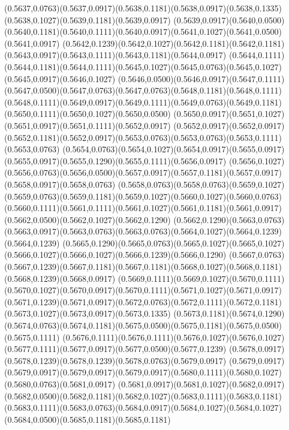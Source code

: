 (0.5637,0.0763)(0.5637,0.0917)(0.5638,0.1181)(0.5638,0.0917)(0.5638,0.1335)(0.5638,0.1027)(0.5639,0.1181)(0.5639,0.0917)
(0.5639,0.0917)(0.5640,0.0500)(0.5640,0.1181)(0.5640,0.1111)(0.5640,0.0917)(0.5641,0.1027)(0.5641,0.0500)(0.5641,0.0917)
(0.5642,0.1239)(0.5642,0.1027)(0.5642,0.1181)(0.5642,0.1181)(0.5643,0.0917)(0.5643,0.1111)(0.5643,0.1181)(0.5644,0.0917)
(0.5644,0.1111)(0.5644,0.1181)(0.5644,0.1111)(0.5645,0.1027)(0.5645,0.0763)(0.5645,0.1027)(0.5645,0.0917)(0.5646,0.1027)
(0.5646,0.0500)(0.5646,0.0917)(0.5647,0.1111)(0.5647,0.0500)(0.5647,0.0763)(0.5647,0.0763)(0.5648,0.1181)(0.5648,0.1111)
(0.5648,0.1111)(0.5649,0.0917)(0.5649,0.1111)(0.5649,0.0763)(0.5649,0.1181)(0.5650,0.1111)(0.5650,0.1027)(0.5650,0.0500)
(0.5650,0.0917)(0.5651,0.1027)(0.5651,0.0917)(0.5651,0.1111)(0.5652,0.0917)
\PST@Solid(0.5652,0.0917)(0.5652,0.0917)(0.5652,0.1181)(0.5652,0.0917)(0.5653,0.0763)(0.5653,0.0763)(0.5653,0.1111)(0.5653,0.0763)
(0.5654,0.0763)(0.5654,0.1027)(0.5654,0.0917)(0.5655,0.0917)(0.5655,0.0917)(0.5655,0.1290)(0.5655,0.1111)(0.5656,0.0917)
(0.5656,0.1027)(0.5656,0.0763)(0.5656,0.0500)(0.5657,0.0917)(0.5657,0.1181)(0.5657,0.0917)(0.5658,0.0917)(0.5658,0.0763)
(0.5658,0.0763)(0.5658,0.0763)(0.5659,0.1027)(0.5659,0.0763)(0.5659,0.1181)(0.5659,0.1027)(0.5660,0.1027)(0.5660,0.0763)
(0.5660,0.1111)(0.5661,0.1111)(0.5661,0.1027)(0.5661,0.1181)(0.5661,0.0917)(0.5662,0.0500)(0.5662,0.1027)(0.5662,0.1290)
(0.5662,0.1290)(0.5663,0.0763)(0.5663,0.0917)(0.5663,0.0763)(0.5663,0.0763)(0.5664,0.1027)(0.5664,0.1239)(0.5664,0.1239)
(0.5665,0.1290)(0.5665,0.0763)(0.5665,0.1027)(0.5665,0.1027)(0.5666,0.1027)(0.5666,0.1027)(0.5666,0.1239)(0.5666,0.1290)
(0.5667,0.0763)(0.5667,0.1239)(0.5667,0.1181)(0.5667,0.1181)(0.5668,0.1027)(0.5668,0.1181)(0.5668,0.1239)(0.5668,0.0917)
(0.5669,0.1111)(0.5669,0.1027)(0.5670,0.1111)(0.5670,0.1027)(0.5670,0.0917)(0.5670,0.1111)(0.5671,0.1027)(0.5671,0.0917)
(0.5671,0.1239)(0.5671,0.0917)(0.5672,0.0763)(0.5672,0.1111)(0.5672,0.1181)(0.5673,0.1027)(0.5673,0.0917)(0.5673,0.1335)
(0.5673,0.1181)(0.5674,0.1290)(0.5674,0.0763)(0.5674,0.1181)(0.5675,0.0500)(0.5675,0.1181)(0.5675,0.0500)(0.5675,0.1111)
(0.5676,0.1111)(0.5676,0.1111)(0.5676,0.1027)(0.5676,0.1027)(0.5677,0.1111)(0.5677,0.0917)(0.5677,0.0500)(0.5677,0.1239)
(0.5678,0.0917)(0.5678,0.1239)(0.5678,0.1239)(0.5678,0.0763)(0.5679,0.0917)
\PST@Solid(0.5679,0.0917)(0.5679,0.0917)(0.5679,0.0917)(0.5679,0.0917)(0.5680,0.1111)(0.5680,0.1027)(0.5680,0.0763)(0.5681,0.0917)
(0.5681,0.0917)(0.5681,0.1027)(0.5682,0.0917)(0.5682,0.0500)(0.5682,0.1181)(0.5682,0.1027)(0.5683,0.1111)(0.5683,0.1181)
(0.5683,0.1111)(0.5683,0.0763)(0.5684,0.0917)(0.5684,0.1027)(0.5684,0.1027)(0.5684,0.0500)(0.5685,0.1181)(0.5685,0.1181)
